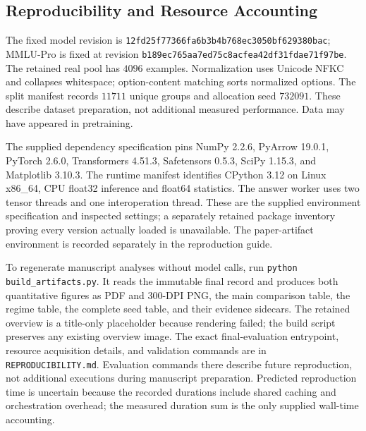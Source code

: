 \documentclass{article}
\begin{document}
\subsection{Reproducibility and Resource Accounting}
The fixed model revision is \texttt{12fd25f77366fa6b3b4b768ec3050bf629380bac}; MMLU-Pro is fixed at revision \texttt{b189ec765aa7ed75c8acfea42df31fdae71f97be}. The retained real pool has $4096$ examples. Normalization uses Unicode NFKC and collapses whitespace; option-content matching sorts normalized options. The split manifest records $11711$ unique groups and allocation seed $732091$. These describe dataset preparation, not additional measured performance. Data may have appeared in pretraining.

The supplied dependency specification pins NumPy 2.2.6, PyArrow 19.0.1, PyTorch 2.6.0, Transformers 4.51.3, Safetensors 0.5.3, SciPy 1.15.3, and Matplotlib 3.10.3. The runtime manifest identifies CPython 3.12 on Linux x86\_64, CPU float32 inference and float64 statistics. The answer worker uses two tensor threads and one interoperation thread. These are the supplied environment specification and inspected settings; a separately retained package inventory proving every version actually loaded is unavailable. The paper-artifact environment is recorded separately in the reproduction guide.

To regenerate manuscript analyses without model calls, run \texttt{python build\_artifacts.py}. It reads the immutable final record and produces both quantitative figures as PDF and 300-DPI PNG, the main comparison table, the regime table, the complete seed table, and their evidence sidecars. The retained overview is a title-only placeholder because rendering failed; the build script preserves any existing overview image. The exact final-evaluation entrypoint, resource acquisition details, and validation commands are in \texttt{REPRODUCIBILITY.md}. Evaluation commands there describe future reproduction, not additional executions during manuscript preparation. Predicted reproduction time is uncertain because the recorded durations include shared caching and orchestration overhead; the measured duration sum is the only supplied wall-time accounting.
\end{document}

